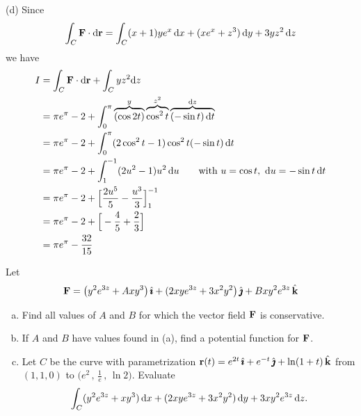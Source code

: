 \begin{solution}
(d) Since
\begin{equation*}
\int_C\mathbf{F}\cdot\mathrm{d}\mathbf{r}
=\int_C (x + 1)ye^x \,\mathrm{d}x + (xe^x + z^3 ) \,\mathrm{d}y + 3yz^2 \,\mathrm{d}z
\end{equation*}
we have
\begin{align*}
I &= \int_C\mathbf{F}\cdot\mathrm{d}\mathbf{r} + \int_C yz^2\mathrm{d}z \\
&= \pi e^\pi-2 +\int_0^\pi \overbrace{(\cos 2t)}^{y}
                           \overbrace{\cos^2 t}^{z^2}
                           \overbrace{(-\sin t)\,\mathrm{d}t}^{\mathrm{d}z} \\
&= \pi e^\pi-2 +\int_0^\pi (2\cos^2t-1)
                           \cos^2 t
                           (-\sin t)\,\mathrm{d}t \\
&= \pi e^\pi-2 +\int_1^{-1} (2u^2-1)u^2\,\mathrm{d}u
     \qquad\text{with } u=\cos t,\ \mathrm{d}u=-\sin t\,\mathrm{d}t \\
&= \pi e^\pi-2 +\Big[\frac{2u^5}{5} -\frac{u^3}{3}\Big]_{1}^{-1}\\
&= \pi e^\pi-2 +\Big[-\frac{4}{5} +\frac{2}{3}\Big] \\
&= \pi e^\pi -\frac{32}{15}  
\end{align*}
\end{solution}

\begin{question}[M317 2011A]\label{nonconserv1} %
Let 
\begin{equation*}
\mathbf{F} = \big(y^2 e^{3z} +Axy^3\big)\,\hat{\pmb{\imath}}
     +(2xye^{3z}+3x^2y^2\big)\,\hat{\pmb{\jmath}}
     +Bxy^2e^{3z}\,\hat{\mathbf{k}}
\end{equation*}
\begin{enumerate}[(a)]
\item
Find all values of $A$ and $B$ for which the vector field $\mathbf{F}$
is conservative.
\item
If $A$ and $B$ have values found in (a), find a potential function 
for $\mathbf{F}$.
\item
Let $C$ be the curve with parametrization 
$\mathbf{r}(t) = e^{2t}\,\hat{\pmb{\imath}} + e^{-t}\,\hat{\pmb{\jmath}} + \ln(1 + t) \,\hat{\mathbf{k}}$ from 
$(1, 1, 0)$ to $\big(e^2\,,\,\frac{1}{e}\,,\,\ln 2\big)$.
Evaluate
\begin{equation*}
\int_C (y^2 e^{3z} + xy^3)\,\mathrm{d}x + (2xye^{3z} + 3x^2 y^2 )\,\mathrm{d}y 
                 + 3xy^2 e^{3z}\,\mathrm{d}z.
\end{equation*}
\end{enumerate}
\end{question}

